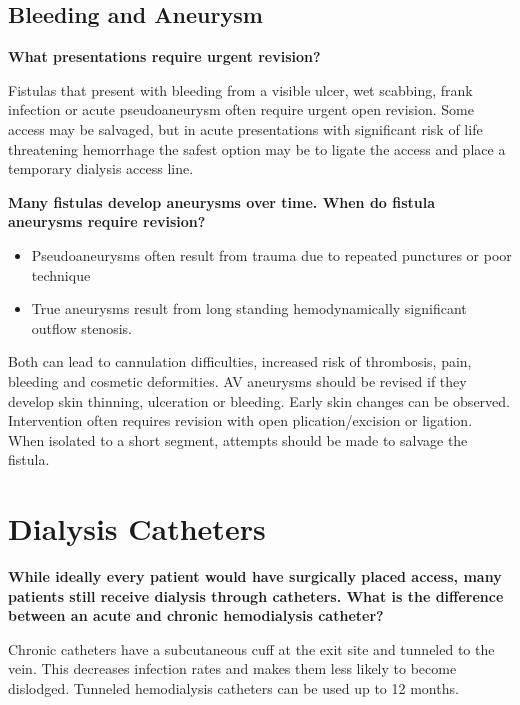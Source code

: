 \documentclass[
]{book}
\begin{document}
\hypertarget{bleeding-and-aneurysm}{%
\subsection{Bleeding and Aneurysm}\label{bleeding-and-aneurysm}}

\textbf{What presentations require urgent revision?}

Fistulas that present with bleeding from a visible ulcer, wet scabbing,
frank infection or acute pseudoaneurysm often require urgent open
revision. Some access may be salvaged, but in acute presentations with
significant risk of life threatening hemorrhage the safest option may be
to ligate the access and place a temporary dialysis access
line.\citep{galbusera2009}

\textbf{Many fistulas develop aneurysms over time. When do fistula aneurysms
require revision?}

\begin{itemize}
\item
  Pseudoaneurysms often result from trauma due to repeated punctures
  or poor technique
\item
  True aneurysms result from long standing hemodynamically significant
  outflow stenosis.
\end{itemize}

Both can lead to cannulation difficulties, increased risk of thrombosis,
pain, bleeding and cosmetic deformities. AV aneurysms should be revised
if they develop skin thinning, ulceration or bleeding. Early skin
changes can be observed. Intervention often requires revision with open
plication/excision or ligation. When isolated to a short segment,
attempts should be made to salvage the fistula.\citep{al-jaishi2017, al-thani2017, pasklinsky2011}

\hypertarget{dialysis-catheters}{%
\section{Dialysis Catheters}\label{dialysis-catheters}}

\textbf{While ideally every patient would have surgically placed access, many
patients still receive dialysis through catheters. What is the
difference between an acute and chronic hemodialysis catheter?}

Chronic catheters have a subcutaneous cuff at the exit site and tunneled
to the vein. This decreases infection rates and makes them less likely
to become dislodged. Tunneled hemodialysis catheters can be used up to
12 months.
\end{document}
